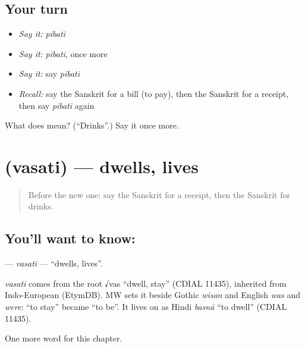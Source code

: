 \subsection*{Your turn}
\begin{itemize}
\raggedright
  \item \emph{Say it:} \emph{pibati}
  \item \emph{Say it:} \emph{pibati}, once more
  \item \emph{Say it:} say \emph{pibati}
  \item \emph{Recall:} say the Sanskrit for a bill (to pay), then the Sanskrit for a receipt, then say \emph{pibati} again
\end{itemize}

\begin{tcolorbox}[breakable,colback=teal!4,colframe=teal!35!black,title={Before you move on}]
What does  mean? (\textquotedblleft{}Drinks\textquotedblright{}.) Say it once more.
\end{tcolorbox}
\section[\texorpdfstring{\sk{वसति} (vasati)}{वसति (vasati)}]{ (vasati) — dwells, lives}

\label{lesson:SA-C141-vasati}



\begin{quote}
Before the new one: say the Sanskrit for a receipt, then the Sanskrit for drinks.
\end{quote}

\subsection*{You'll want to know: }
\textbf{} — \emph{vasati} — \textquotedblleft{}dwells, lives\textquotedblright{}.

\begin{cousinweb}
\emph{vasati} comes from the root √vas \textquotedblleft{}dwell, stay\textquotedblright{} (CDIAL 11435), inherited from Indo-European (EtymDB). MW sets it beside Gothic \emph{wisan} and English \emph{was} and \emph{were}: \textquotedblleft{}to stay\textquotedblright{} became \textquotedblleft{}to be\textquotedblright{}. It lives on as Hindi \emph{basnā} \textquotedblleft{}to dwell\textquotedblright{} (CDIAL 11435).
\end{cousinweb}

\begin{grammarlens}[title={What you've built}]
One more word for this chapter.
\end{grammarlens}

